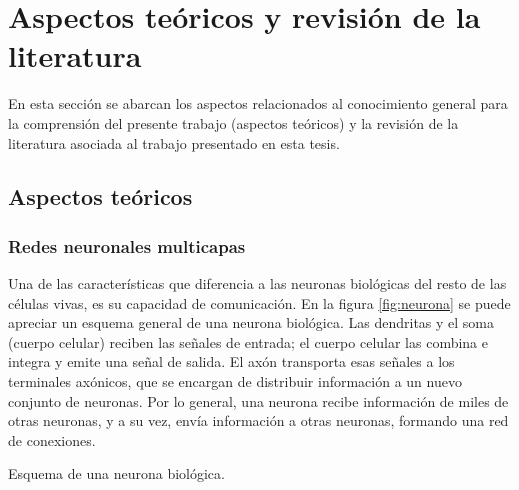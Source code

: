 \chapter{Aspectos teóricos y revisión de la literatura}

En esta sección se abarcan los aspectos relacionados al conocimiento general para la comprensión del presente trabajo (aspectos teóricos) y la revisión de la literatura asociada al trabajo presentado en esta tesis. %




\section{Aspectos teóricos}
\subsection{Redes neuronales multicapas}
Una de las características que diferencia a las neuronas biológicas del resto de las células vivas, es su capacidad de comunicación. En la figura \ref{fig:neurona} se puede apreciar un esquema general de una neurona biológica. Las dendritas y el soma (cuerpo celular) reciben las señales de entrada; el cuerpo celular las combina e integra y emite una señal de salida. El axón transporta esas señales a los terminales axónicos, que se encargan de distribuir información a un nuevo conjunto de neuronas. Por lo general, una neurona recibe información de miles de otras neuronas, y a su vez, envía información a otras neuronas, formando una red de conexiones.
\begin{imagen}
	\scalebox{0.07}{}
	\caption{Esquema de una neurona biológica.}
	\label{fig:neurona}
\end{imagen}


